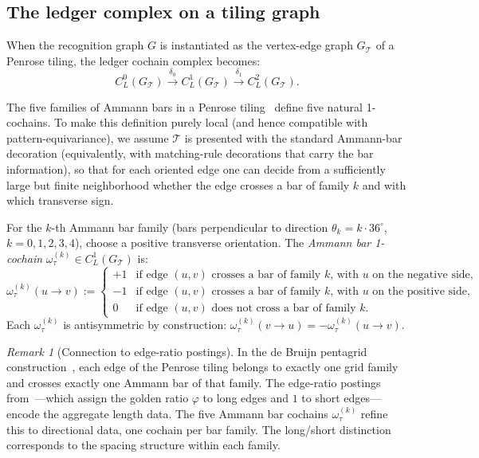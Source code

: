 \documentclass[12pt]{article}
\theoremstyle{definition}
\theoremstyle{remark}
\newtheorem{remark}[theorem]{Remark}
\begin{document}
\subsection{The ledger complex on a tiling graph}

When the recognition graph $G$ is instantiated as the vertex-edge graph $G_{\mathcal{T}}$ of a Penrose tiling, the ledger cochain complex becomes:
\begin{equation}
C^0_L(G_{\mathcal{T}}) \xrightarrow{\;\delta_0\;} C^1_L(G_{\mathcal{T}}) \xrightarrow{\;\delta_1\;} C^2_L(G_{\mathcal{T}}).
\label{eq:ledger-tiling-complex}
\end{equation}

The five families of Ammann bars in a Penrose tiling~\cite{GrunbaumShephard1987,BaakeGrimm2013} define five natural 1-cochains. To make this definition purely local (and hence compatible with pattern-equivariance), we assume $\mathcal{T}$ is presented with the standard Ammann-bar decoration (equivalently, with matching-rule decorations that carry the bar information), so that for each oriented edge one can decide from a sufficiently large but finite neighborhood whether the edge crosses a bar of family $k$ and with which transverse sign.

For the $k$-th Ammann bar family (bars perpendicular to direction $\theta_k = k \cdot 36^\circ$, $k = 0, 1, 2, 3, 4$), choose a positive transverse orientation. The \emph{Ammann bar 1-cochain} $\omega_\tau^{(k)} \in C^1_L(G_{\mathcal{T}})$ is:
\begin{equation}
\omega_\tau^{(k)}(u \to v) := \begin{cases}
+1 & \text{if edge $(u,v)$ crosses a bar of family $k$, with $u$ on the negative side}, \\
-1 & \text{if edge $(u,v)$ crosses a bar of family $k$, with $u$ on the positive side}, \\
0 & \text{if edge $(u,v)$ does not cross a bar of family $k$}.
\end{cases}
\label{eq:edge-type-cochain}
\end{equation}
Each $\omega_\tau^{(k)}$ is antisymmetric by construction: $\omega_\tau^{(k)}(v \to u) = -\omega_\tau^{(k)}(u \to v)$.

\begin{remark}[Connection to edge-ratio postings]
In the de Bruijn pentagrid construction~\cite{BaakeGrimm2013}, each edge of the Penrose tiling belongs to exactly one grid family and crosses exactly one Ammann bar of that family. The edge-ratio postings from~\cite{PardoGuerraGolden2026}---which assign the golden ratio $\varphi$ to long edges and $1$ to short edges---encode the aggregate length data. The five Ammann bar cochains $\omega_\tau^{(k)}$ refine this to directional data, one cochain per bar family. The long/short distinction corresponds to the spacing structure within each family.
\end{remark}
\end{document}
